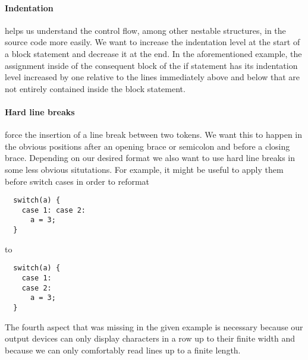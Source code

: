 \paragraph{Indentation} helps us understand the control flow,
among other nestable structures, in the source code more easily.
We want to increase the indentation level at the start of a block statement and decrease it at the end.
In the aforementioned example, the assignment inside of the consequent block of the if statement
has its indentation level increased by one relative to the lines immediately above and below
that are not entirely contained inside the block statement.

\paragraph{Hard line breaks} force the insertion of a line break between two tokens.
We want this to happen in the obvious positions after an opening brace or semicolon and before a closing brace.
Depending on our desired format we also want to use hard line breaks in some less obvious situtations.
For example, it might be useful to apply them before switch cases in order to reformat
\begin{verbatim}
  switch(a) {
    case 1: case 2:
      a = 3;
  }
\end{verbatim}
to
\begin{verbatim}
  switch(a) {
    case 1:
    case 2:
      a = 3;
  }
\end{verbatim}

\bigbreak{}
The fourth aspect that was missing in the given example is necessary
because our output devices can only display characters in a row up to their finite width and
because we can only comfortably read lines up to a finite length.
